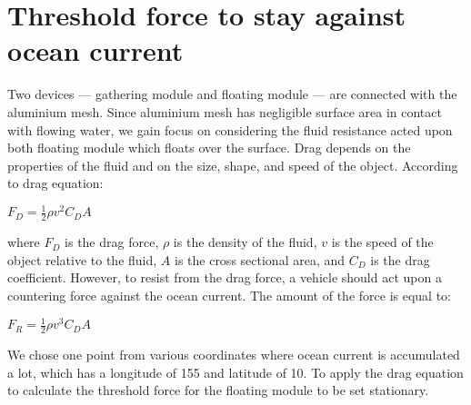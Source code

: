 \documentclass{article}
\begin{document}
\section{Threshold force to stay against ocean current}
Two devices --- gathering module and floating module --- are connected with the aluminium mesh. Since aluminium mesh has negligible surface area in contact with flowing water, we gain focus on considering the fluid resistance acted upon both floating module which floats over the surface.
 Drag depends on the properties of the fluid and on the size, shape, and speed of the object. According to drag equation: \newline
 \begin{center}
     $F_D=$$\frac{1}{2}$$\rho v^2 C_D A$
 \end{center}
where $F_D$ is the drag force, $\rho$ is the density of the fluid, $v$ is the speed of the object relative to the fluid, $A$ is the cross sectional area, and $C_D$ is the drag coefficient. \newline
However, to resist from the drag force, a vehicle should act upon a countering force against the ocean current. The amount of the force is equal to: \newline
\begin{center}
    $F_R=$$\frac{1}{2}$$\rho v^3 C_D A$
\end{center}
We chose one point from various coordinates where ocean current is accumulated a lot, which has a longitude of 155 and latitude of 10.
To apply the drag equation to calculate the threshold force for the floating module to be set stationary. \newline
\end{document}
